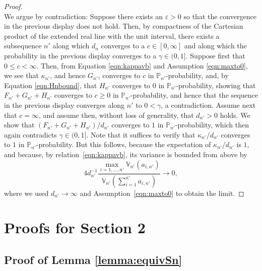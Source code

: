 \documentclass[preprint]{imsart}
\newcommand{\eps}{\varepsilon}
\numberwithin{equation}{section}
\begin{document}
\begin{proof}
\begin{equation}
\end{equation}
%
We argue by contradiction: Suppose there exists an $\eps > 0$ so that the convergence in the previous display does not hold. Then, by compactness of the Cartesian product of the extended real line with the unit interval, there exists a subsequence $n'$ along which $d_n$ converges to a $c \in [0, \infty]$ and along which the probability in the previous display converges to a $\gamma \in (0, 1] $. Suppose first that $0 \leq c < \infty$. Then, from Equation \eqref{eqn:kappavb} and Assumption \eqref{eqn:maxto0}, we see that $\kappa_{n'}$, and hence $G_{n'}$, converges to $c$ in $\mathbb{P}_{n'}$-probability, and, by Equation \eqref{eqn:Hnbound}, that $H_{n'}$ converges to $0$ in $\mathbb{P}_{n'}$-probability, showing that $F_{n'} + G_{n'} + H_{n'}$ converges to $c \geq 0$ in $\mathbb{P}_{n'}$-probability, and hence that the sequence in the previous display converges along $n'$ to $0<\gamma$, a contradiction. Assume next that $c = \infty$, and assume then, without loss of generality, that $d_{n'} > 0$ holds. We show that $(F_{n'} + G_{n'} + H_{n'})/d_{n'}$ converges to $1$ in $\mathbb{P}_{n'}$-probability, which then again contradicts $\gamma \in (0, 1]$. Note that it suffices to verify that $\kappa_{n'}/d_{n'}$ converges to $1$  in $\mathbb{P}_{n'}$-probability. But this follows, because the expectation of $\kappa_{n'}/d_{n'}$ is $1$, and because, by relation~\eqref{eqn:kappavb}, its variance is bounded from above by
%
\begin{equation}
4 d_{n'}^{-1} \frac{\max_{i = 1, \hdots, n'} \mathbb{V}_{n'}(a_{i,n'})}{ \mathbb{V}_{n'}(\sum_{i = 1}^{n'} a_{i,n'})} \to 0,
\end{equation}
%
where we used $d_{n'} \to \infty$ and Assumption~\eqref{eqn:maxto0} to obtain the limit.
\end{proof}



\section{Proofs for Section 2}
\label{app:posi}

\subsection{Proof of Lemma \ref{lemma:equivSn}}
\label{sec:equivSn}
\end{document}
